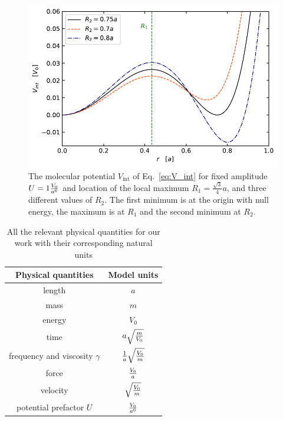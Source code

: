 \begin{figure}
\begin{center}
    \centering
    \includegraphics[width=1\linewidth]{Images/V_int.pdf}
    \caption{The molecular potential $V_\text{int}$ of Eq.~\eqref{eq:V_int} for fixed amplitude $U = 1 \frac{V_0}{a^6}$ and location of the local maximum $R_1 = \frac{\sqrt{3}}{4} a$, and three different values of $R_2$. The first minimum is at the origin with null energy, the maximum is at $R_1$ and the second minimum at $R_2$.}
    \label{Fig:V_int}
\end{center}
\end{figure}

\begin{table}[]
    \centering
    \renewcommand\arraystretch{1.4}
    \begin{tabular}{c|c}
        \toprule
        Physical quantities &  Model units\\
        \midrule
        length             &   $a$   \\
        mass               &   $m$   \\
        energy             &   $V_0$  \\
        time               &   $a\sqrt{\frac{m}{V_0}}$   \\
        frequency and viscosity $\gamma$           &   $\frac{1}{a}\sqrt{\frac{V_0}{m}}$ \\
        force              &   $\frac{V_0}{a}$    \\
        velocity           &   $\sqrt{\frac{V_0}{m}}$  \\
        potential prefactor $U$        &   $\frac{V_0}{a^6}$  \\
        \bottomrule
    \end{tabular}
    \renewcommand\arraystretch{1.2}
    \caption{All the relevant physical quantities for our work with their corresponding natural units}
    \label{tab:natural_units}
\end{table}


